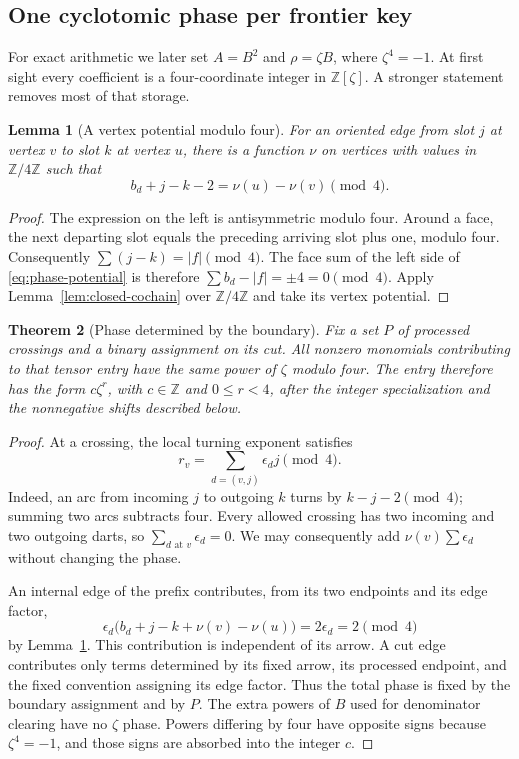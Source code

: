 \documentclass[11pt]{article}
\newtheorem{theorem}{Theorem}[section]
\newtheorem{lemma}[theorem]{Lemma}
\theoremstyle{definition}
\theoremstyle{remark}
\newcommand{\Z}{\mathbb Z}
\begin{document}
\subsection{One cyclotomic phase per frontier key}

For exact arithmetic we later set $A=B^2$ and $\rho=\zeta B$, where
$\zeta^4=-1$. At first sight every coefficient is a four-coordinate
integer in $\Z[\zeta]$. A stronger statement removes most of that storage.

\begin{lemma}[A vertex potential modulo four]
\label{lem:phase-potential}
For an oriented edge from slot $j$ at vertex $v$ to slot $k$ at vertex $u$,
there is a function $\nu$ on vertices with values in $\Z/4\Z$ such that
\begin{equation}\label{eq:phase-potential}
 b_d+j-k-2=\nu(u)-\nu(v)\pmod4.
\end{equation}
\end{lemma}

\begin{proof}
The expression on the left is antisymmetric modulo four. Around a face,
the next departing slot equals the preceding arriving slot plus one,
modulo four. Consequently $\sum(j-k)=|f|\pmod4$. The face sum of the
left side of \eqref{eq:phase-potential} is therefore
$\sum b_d-|f|=\pm4=0\pmod4$. Apply
Lemma~\ref{lem:closed-cochain} over $\Z/4\Z$ and take its vertex potential.
\end{proof}

\begin{theorem}[Phase determined by the boundary]
\label{thm:one-phase}
Fix a set $P$ of processed crossings and a binary assignment on its cut.
All nonzero monomials contributing to that tensor entry have the same
power of $\zeta$ modulo four. The entry therefore has the form
$c\zeta^r$, with $c\in\Z$ and $0\le r<4$, after the integer
specialization and the nonnegative shifts described below.
\end{theorem}

\begin{proof}
At a crossing, the local turning exponent satisfies
\[
 r_v=\sum_{d=(v,j)}\epsilon_d j\pmod4.
\]
Indeed, an arc from incoming $j$ to outgoing $k$ turns by
$k-j-2\pmod4$; summing two arcs subtracts four.
Every allowed crossing has two incoming and two outgoing darts, so
$\sum_{d\text{ at }v}\epsilon_d=0$. We may consequently add
$\nu(v)\sum\epsilon_d$ without changing the phase.

An internal edge of the prefix contributes, from its two endpoints and
its edge factor,
\[
 \epsilon_d\bigl(b_d+j-k+\nu(v)-\nu(u)\bigr)
       =2\epsilon_d=2\pmod4
\]
by Lemma~\ref{lem:phase-potential}. This contribution is independent of
its arrow. A cut edge contributes only terms determined by its fixed
arrow, its processed endpoint, and the fixed convention assigning its
edge factor. Thus the total phase is fixed by the boundary assignment and
by $P$. The extra powers of $B$ used for denominator clearing have no
$\zeta$ phase. Powers differing by four have opposite signs because
$\zeta^4=-1$, and those signs are absorbed into the integer $c$.
\end{proof}
\end{document}
